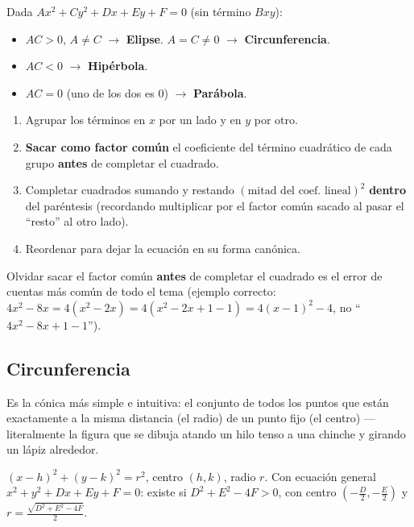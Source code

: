 \documentclass[11pt,a4paper]{article}
\begin{document}
\begin{teoria}
Dada $Ax^2+Cy^2+Dx+Ey+F=0$ (sin término $Bxy$):
\begin{itemize}
    \item $AC>0$, $A\neq C$ $\to$ \textbf{Elipse}. \quad $A=C\neq0$ $\to$
    \textbf{Circunferencia}.
    \item $AC<0$ $\to$ \textbf{Hipérbola}.
    \item $AC=0$ (uno de los dos es 0) $\to$ \textbf{Parábola}.
\end{itemize}
\end{teoria}

\begin{proc}
\begin{enumerate}
    \item Agrupar los términos en $x$ por un lado y en $y$ por otro.
    \item \textbf{Sacar como factor común} el coeficiente del término cuadrático de cada
    grupo \textbf{antes} de completar el cuadrado.
    \item Completar cuadrados sumando y restando $(\text{mitad del coef.\ lineal})^2$
    \textbf{dentro} del paréntesis (recordando multiplicar por el factor común sacado al
    pasar el ``resto'' al otro lado).
    \item Reordenar para dejar la ecuación en su forma canónica.
\end{enumerate}
\end{proc}

\begin{atencion}
Olvidar sacar el factor común \textbf{antes} de completar el cuadrado es el error de
cuentas más común de todo el tema (ejemplo correcto: $4x^2-8x=4(x^2-2x)=4(x^2-2x+1-1)=
4(x-1)^2-4$, no ``$4x^2-8x+1-1$'').
\end{atencion}

\subsection{Circunferencia}

\begin{intuicion}
Es la cónica más simple e intuitiva: el conjunto de todos los puntos que están
exactamente a la misma distancia (el radio) de un punto fijo (el centro) — literalmente
la figura que se dibuja atando un hilo tenso a una chinche y girando un lápiz alrededor.
\end{intuicion}

\begin{teoria}
$(x-h)^2+(y-k)^2=r^2$, centro $(h,k)$, radio $r$. Con ecuación general
$x^2+y^2+Dx+Ey+F=0$: existe si $D^2+E^2-4F>0$, con centro $\left(-\frac D2,-\frac
E2\right)$ y $r=\frac{\sqrt{D^2+E^2-4F}}{2}$.
\end{teoria}
\end{document}
